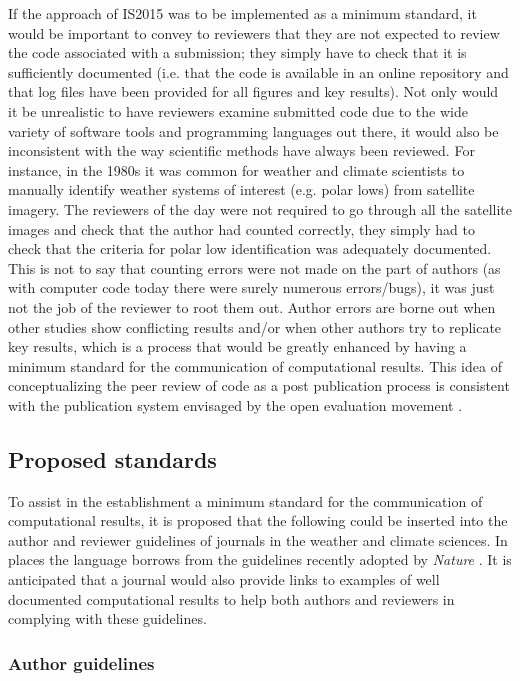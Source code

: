 If the approach of IS2015 was to be implemented as a minimum standard, it would be important to convey to reviewers that they are not expected to review the code associated with a submission; they simply have to check that it is sufficiently documented (i.e. that the code is available in an online repository and that log files have been provided for all figures and key results). Not only would it be unrealistic to have reviewers examine submitted code due to the wide variety of software tools and programming languages out there, it would also be inconsistent with the way scientific methods have always been reviewed. For instance, in the 1980s it was common for weather and climate scientists to manually identify weather systems of interest (e.g. polar lows) from satellite imagery. The reviewers of the day were not required to go through all the satellite images and check that the author had counted correctly, they simply had to check that the criteria for polar low identification was adequately documented. This is not to say that counting errors were not made on the part of authors (as with computer code today there were surely numerous errors/bugs), it was just not the job of the reviewer to root them out. Author errors are borne out when other studies show conflicting results and/or when other authors try to replicate key results, which is a process that would be greatly enhanced by having a minimum standard for the communication of computational results. This idea of conceptualizing the peer review of code as a post publication process is consistent with the publication system envisaged by the open evaluation movement \citep[e.g.][]{Kriegeskorte2012}. 
  
\subsection{Proposed standards}

To assist in the establishment a minimum standard for the communication of computational results, it is proposed that the following could be inserted into the author and reviewer guidelines of journals in the weather and climate sciences. In places the language borrows from the guidelines recently adopted by \textit{Nature} \citep{Nature2014}. It is anticipated that a journal would also provide links to examples of well documented computational results to help both authors and reviewers in complying with these guidelines.

\subsubsection{Author guidelines}

